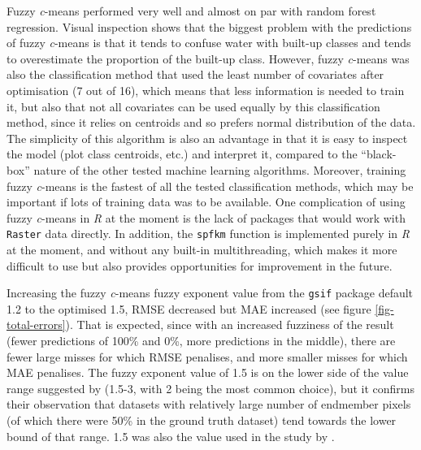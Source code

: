 \documentclass[a4paper,12pt]{scrbook}
\begin{document}
Fuzzy \textit{c}-means performed very well and almost on par with random forest regression. Visual inspection shows that the biggest problem with the predictions of fuzzy \textit{c}-means is that it tends to confuse water with built-up classes and tends to overestimate the proportion of the built-up class. However, fuzzy \textit{c}-means was also the classification method that used the least number of covariates after optimisation (7 out of 16), which means that less information is needed to train it, but also that not all covariates can be used equally by this classification method, since it relies on centroids and so prefers normal distribution of the data. The simplicity of this algorithm is also an advantage in that it is easy to inspect the model (plot class centroids, etc.) and interpret it, compared to the ``black-box'' nature of the other tested machine learning algorithms. Moreover, training fuzzy \textit{c}-means is the fastest of all the tested classification methods, which may be important if lots of training data was to be available. One complication of using fuzzy \textit{c}-means in \textit{R} at the moment is the lack of packages that would work with \texttt{Raster} data directly. In addition, the \texttt{spfkm} function is implemented purely in \textit{R} at the moment, and without any built-in multithreading, which makes it more difficult to use but also provides opportunities for improvement in the future.

Increasing the fuzzy \textit{c}-means fuzzy exponent value from the \texttt{gsif} package default 1.2 to the optimised 1.5, RMSE decreased but MAE increased (see figure \ref{fig-total-errors}). That is expected, since with an increased fuzziness of the result (fewer predictions of 100\% and 0\%, more predictions in the middle), there are fewer large misses for which RMSE penalises, and more smaller misses for which MAE penalises. The fuzzy exponent value of 1.5 is on the lower side of the value range suggested by \citet{Okeke2006fuzzyexponent} (1.5-3, with 2 being the most common choice), but it confirms their observation that datasets with relatively large number of endmember pixels (of which there were 50\% in the ground truth dataset) tend towards the lower bound of that range. 1.5 was also the value used in the study by \citet{burrough2001fuzzy}.
\end{document}
